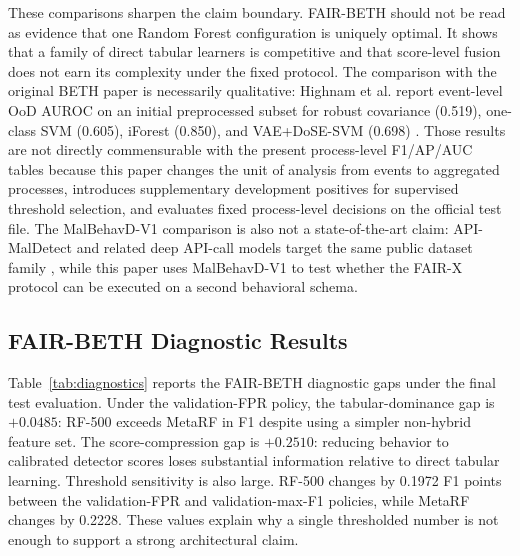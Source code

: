 \documentclass[10pt,journal,compsoc]{IEEEtran}
\begin{document}
These comparisons sharpen the claim boundary. FAIR-BETH should not be read as evidence that one Random Forest configuration is uniquely optimal. It shows that a family of direct tabular learners is competitive and that score-level fusion does not earn its complexity under the fixed protocol. The comparison with the original BETH paper is necessarily qualitative: Highnam et al. report event-level OoD AUROC on an initial preprocessed subset for robust covariance (0.519), one-class SVM (0.605), iForest (0.850), and VAE+DoSE-SVM (0.698) \cite{highnam2021}. Those results are not directly commensurable with the present process-level F1/AP/AUC tables because this paper changes the unit of analysis from events to aggregated processes, introduces supplementary development positives for supervised threshold selection, and evaluates fixed process-level decisions on the official test file. The MalBehavD-V1 comparison is also not a state-of-the-art claim: API-MalDetect and related deep API-call models target the same public dataset family \cite{maniriho2023}, while this paper uses MalBehavD-V1 to test whether the FAIR-X protocol can be executed on a second behavioral schema.

\subsection{FAIR-BETH Diagnostic Results}

Table~\ref{tab:diagnostics} reports the FAIR-BETH diagnostic gaps under the final test evaluation. Under the validation-FPR policy, the tabular-dominance gap is $+0.0485$: RF-500 exceeds MetaRF in F1 despite using a simpler non-hybrid feature set. The score-compression gap is $+0.2510$: reducing behavior to calibrated detector scores loses substantial information relative to direct tabular learning. Threshold sensitivity is also large. RF-500 changes by 0.1972 F1 points between the validation-FPR and validation-max-F1 policies, while MetaRF changes by 0.2228. These values explain why a single thresholded number is not enough to support a strong architectural claim.
\end{document}
